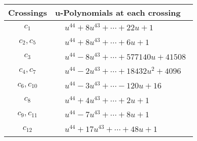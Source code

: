 \documentclass[1p]{elsarticle_modified}
\theoremstyle{definition}
\begin{document}
\begin{tabular}{m{50pt}|m{274pt}}
Crossings & \hspace{64pt}u-Polynomials at each crossing \\
\hline $$\begin{aligned}c_{1}\end{aligned}$$&$\begin{aligned}
&u^{44}+8 u^{43}+\cdots+22 u+1
\end{aligned}$\\
\hline $$\begin{aligned}c_{2},c_{5}\end{aligned}$$&$\begin{aligned}
&u^{44}+8 u^{43}+\cdots+6 u+1
\end{aligned}$\\
\hline $$\begin{aligned}c_{3}\end{aligned}$$&$\begin{aligned}
&u^{44}-8 u^{43}+\cdots+577140 u+41508
\end{aligned}$\\
\hline $$\begin{aligned}c_{4},c_{7}\end{aligned}$$&$\begin{aligned}
&u^{44}-2 u^{43}+\cdots+18432 u^2+4096
\end{aligned}$\\
\hline $$\begin{aligned}c_{6},c_{10}\end{aligned}$$&$\begin{aligned}
&u^{44}-3 u^{43}+\cdots-120 u+16
\end{aligned}$\\
\hline $$\begin{aligned}c_{8}\end{aligned}$$&$\begin{aligned}
&u^{44}+4 u^{43}+\cdots+2 u+1
\end{aligned}$\\
\hline $$\begin{aligned}c_{9},c_{11}\end{aligned}$$&$\begin{aligned}
&u^{44}-7 u^{43}+\cdots+8 u+1
\end{aligned}$\\
\hline $$\begin{aligned}c_{12}\end{aligned}$$&$\begin{aligned}
&u^{44}+17 u^{43}+\cdots+48 u+1
\end{aligned}$\\
\hline
\end{tabular}\\~\\
\end{document}
